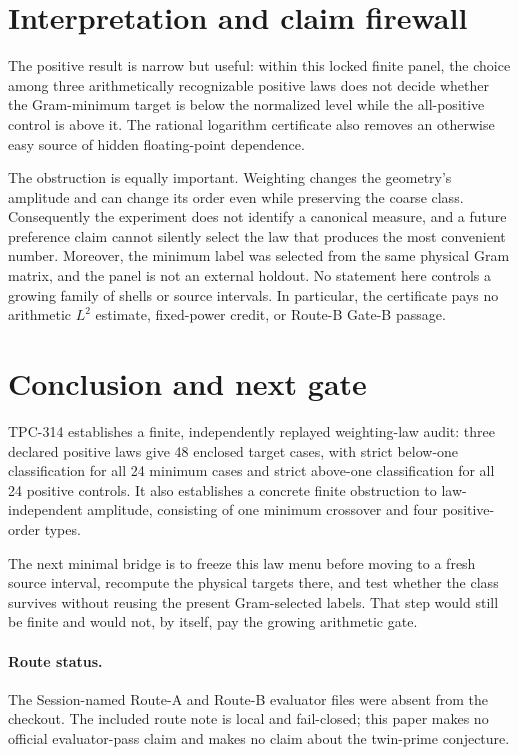 \documentclass[10pt,a4paper]{article}
\begin{document}
\section{Interpretation and claim firewall}

The positive result is narrow but useful: within this locked finite panel, the
choice among three arithmetically recognizable positive laws does not decide
whether the Gram-minimum target is below the normalized level while the
all-positive control is above it.  The rational logarithm certificate also
removes an otherwise easy source of hidden floating-point dependence.

The obstruction is equally important.  Weighting changes the geometry's
amplitude and can change its order even while preserving the coarse class.
Consequently the experiment does not identify a canonical measure, and a
future preference claim cannot silently select the law that produces the most
convenient number.  Moreover, the minimum label was selected from the same
physical Gram matrix, and the panel is not an external holdout.  No statement
here controls a growing family of shells or source intervals.  In particular,
the certificate pays no arithmetic $L^2$ estimate, fixed-power credit, or
Route-B Gate-B passage.

\section{Conclusion and next gate}

TPC-314 establishes a finite, independently replayed weighting-law audit:
three declared positive laws give 48 enclosed target cases, with strict
below-one classification for all 24 minimum cases and strict above-one
classification for all 24 positive controls.  It also establishes a concrete
finite obstruction to law-independent amplitude, consisting of one minimum
crossover and four positive-order types.

The next minimal bridge is to freeze this law menu before moving to a fresh
source interval, recompute the physical targets there, and test whether the
class survives without reusing the present Gram-selected labels.  That step
would still be finite and would not, by itself, pay the growing arithmetic
gate.

\paragraph{Route status.}
The Session-named Route-A and Route-B evaluator files were absent from the
checkout.  The included route note is local and fail-closed; this paper makes
no official evaluator-pass claim and makes no claim about the twin-prime
conjecture.


\begingroup\small

\endgroup
\end{document}

